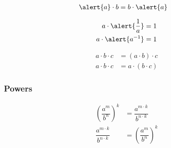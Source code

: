 \begin{definition}
\begin{align}
\alert{a} \cdot b &= b \cdot \alert{a} \label{eq:cpm}
\end{align}
\end{definition}



\begin{definition}
\begin{subequations}
\begin{align}
a \cdot \alert{\dfrac{1}{a}} &= 1 \label{eq:mi1} \\
a \cdot \alert{a^{-1}} &= 1 \label{eq:mi2} 
\end{align}
\end{subequations}
\end{definition}

\begin{definition}
\begin{subequations}
\begin{align}
a\cdot b\cdot c &= (a\cdot b)\cdot c \label{eq:apm1} \\
a\cdot b\cdot c &= a\cdot (b\cdot c) \label{eq:apm2}
\end{align}
\end{subequations}
\end{definition}



\subsubsection{Powers}


\begin{arule}
\begin{subequations}
\begin{align}
	\left(\dfrac{a^m}{b^n}\right)^k &= \dfrac{a^{m \cdot k}}{b^{n\cdot k}} \label{eq:poqpo1}\\
	\dfrac{a^{m \cdot k}}{b^{n\cdot k}} &= \left(\dfrac{a^m}{b^n}\right)^k \label{eq:poqpo2}
\end{align}
\end{subequations}
\end{arule}

